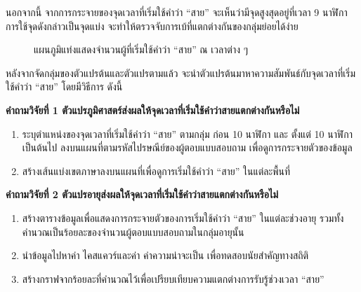 \documentclass[a4paper]{article}
\begin{document}
    นอกจากนี้ จากการกระจายของจุดเวลาที่เริ่มใช้คำว่า “สาย” จะเห็นว่ามีจุดสูงสุดอยู่ที่เวลา 9 นาฬิกา การใช้จุดดังกล่าวเป็นจุดแบ่ง จะทำให้ตรวจจับการเบ้ที่แตกต่างกันของกลุ่มย่อยได้ง่าย
    \begin{figure}[!ht]
        \begin{center}
        \end{center}
        \caption{แผนภูมิแท่งแสดงจำนวนผู้ที่เริ่มใช้คำว่า “สาย” ณ เวลาต่าง ๆ}
    \end{figure}
    \newpage

    หลังจากจัดกลุ่มของตัวแปรต้นและตัวแปรตามแล้ว จะนำตัวแปรต้นมาหาความสัมพันธ์กับจุดเวลาที่เริ่มใช้คำว่า “สาย” โดยมีวิธีการ ดังนี้

    \textbf{คำถามวิจัยที่ 1 ตัวแปรภูมิศาสตร์ส่งผลให้จุดเวลาที่เริ่มใช้คำว่าสายแตกต่างกันหรือไม่}
    \begin{enumerate}
        \item ระบุตำแหน่งของจุดเวลาที่เริ่มใช้คำว่า “สาย” ตามกลุ่ม  ก่อน 10 นาฬิกา  และ ตั้งแต่ 10 นาฬิกาเป็นต้นไป ลงบนแผนที่ตามรหัสไปรษณีย์ของผู้ตอบแบบสอบถาม เพื่อดูการกระจายตัวของข้อมูล
        \item สร้างเส้นแบ่งเขตภาษาลงบนแผนที่เพื่อดูการเริ่มใช้คำว่า “สาย” ในแต่ละพื้นที่
    \end{enumerate}

    \textbf{คำถามวิจัยที่ 2 ตัวแปรอายุส่งผลให้จุดเวลาที่เริ่มใช้คำว่าสายแตกต่างกันหรือไม่}
    \begin{enumerate}
        \item สร้างตารางข้อมูลเพื่อแสดงการกระจายตัวของการเริ่มใช้คำว่า “สาย” ในแต่ละช่วงอายุ รวมทั้งคำนวณเป็นร้อยละของจำนวนผู้ตอบแบบสอบถามในกลุ่มอายุนั้น
        \item นำข้อมูลไปหาค่า ไคสแควร์และค่า  ค่าความน่าจะเป็น เพื่อทดสอบนัยสำคัญทางสถิติ
        \item สร้างกราฟจากร้อยละที่คำนวณไว้เพื่อเปรียบเทียบความแตกต่างการรับรู้ช่วงเวลา “สาย”
    \end{enumerate}
\end{document}

